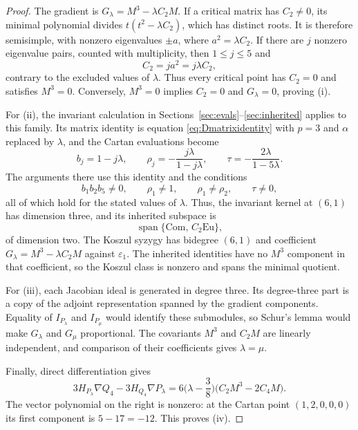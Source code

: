 \documentclass[10pt,reqno]{amsart}
\numberwithin{equation}{section}
\theoremstyle{plain}
\theoremstyle{definition}
\newcommand{\Eu}{\mathrm{Eu}}
\begin{document}
\begin{proof}
The gradient is $G_\lambda=M^3-\lambda C_2M$. If a critical matrix has $C_2\neq0$, its minimal polynomial divides $t(t^2-\lambda C_2)$, which has distinct roots. It is therefore semisimple, with nonzero eigenvalues $\pm a$, where $a^2=\lambda C_2$. If there are $j$ nonzero eigenvalue pairs, counted with multiplicity, then $1\le j\le5$ and
\begin{equation*}
	C_2=ja^2=j\lambda C_2,
\end{equation*}
contrary to the excluded values of $\lambda$. Thus every critical point has $C_2=0$ and satisfies $M^3=0$. Conversely, $M^3=0$ implies $C_2=0$ and $G_\lambda=0$, proving (i).

For (ii), the invariant calculation in Sections~\ref{sec:evals}--\ref{sec:inherited} applies to this family. Its matrix identity is equation \eqref{eq:Dmatrixidentity} with $p=3$ and $\alpha$ replaced by $\lambda$, and the Cartan evaluations become
\begin{equation*}
	b_j=1-j\lambda,\qquad
	\rho_j=-\frac{j\lambda}{1-j\lambda},\qquad
	\tau=-\frac{2\lambda}{1-5\lambda}.
\end{equation*}
The arguments there use this identity and the conditions
\begin{equation*}
	b_1b_2b_5\neq0,\qquad
	\rho_1\neq1,\qquad \rho_1\neq\rho_2,\qquad \tau\neq0,
\end{equation*}
all of which hold for the stated values of $\lambda$. Thus, the invariant kernel at $(6,1)$ has dimension three, and its inherited subspace is
\begin{equation*}
	\operatorname{span}\{\mathrm{Com},\,C_2\Eu\},
\end{equation*}
of dimension two. The Koszul syzygy has bidegree $(6,1)$ and coefficient $G_\lambda=M^3-\lambda C_2M$ against $\varepsilon_1$. The inherited identities have no $M^3$ component in that coefficient, so the Koszul class is nonzero and spans the minimal quotient.

For (iii), each Jacobian ideal is generated in degree three. Its degree-three part is a copy of the adjoint representation spanned by the gradient components. Equality of $I_{P_\lambda}$ and $I_{P_\mu}$ would identify these submodules, so Schur's lemma would make $G_\lambda$ and $G_\mu$ proportional. The covariants $M^3$ and $C_2M$ are linearly independent, and comparison of their coefficients gives $\lambda=\mu$.

Finally, direct differentiation gives
\begin{equation}\label{eq:fixed-quartic-residual}
	3H_{P_\lambda}\nabla Q_4-3H_{Q_4}\nabla P_\lambda
	=6\Big(\lambda-\frac38\Big)\big(C_2M^3-2C_4M\big).
\end{equation}
The vector polynomial on the right is nonzero: at the Cartan point $(1,2,0,0,0)$ its first component is $5-17=-12$. This proves (iv).
\end{proof}
\end{document}
